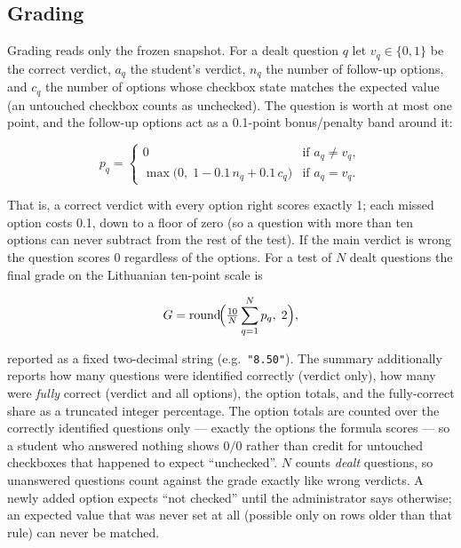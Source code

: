 \documentclass[11pt,a4paper]{article}
\newcommand{\code}[1]{\texttt{#1}}
\begin{document}
\subsection{Grading}
\label{sec:grading}

Grading reads only the frozen snapshot. For a dealt question $q$ let
$v_q \in \{0,1\}$ be the correct verdict, $a_q$ the student's verdict,
$n_q$ the number of follow-up options, and $c_q$ the number of options
whose checkbox state matches the expected value (an untouched checkbox
counts as unchecked). The question is worth at most one point, and the
follow-up options act as a 0.1-point bonus/penalty band around it:

\begin{equation*}
p_q =
\begin{cases}
  0 & \text{if } a_q \neq v_q,\\[2pt]
  \max\bigl(0,\; 1 - 0.1\,n_q + 0.1\,c_q\bigr) & \text{if } a_q = v_q.
\end{cases}
\end{equation*}

That is, a correct verdict with every option right scores exactly 1;
each missed option costs 0.1, down to a floor of zero (so a question
with more than ten options can never subtract from the rest of the
test). If the main verdict is wrong the question scores 0 regardless
of the options. For a test of $N$ dealt
questions the final grade on the Lithuanian ten-point scale is

\begin{equation*}
G = \operatorname{round}\!\Bigl(\tfrac{10}{N}\sum_{q=1}^{N} p_q,\; 2\Bigr),
\end{equation*}

reported as a fixed two-decimal string (e.g.\ \code{"8.50"}). The
summary additionally reports how many questions were identified
correctly (verdict only), how many were \emph{fully} correct (verdict
and all options), the option totals, and the fully-correct share as a
truncated integer percentage. The option totals are counted over the
correctly identified questions only --- exactly the options the formula
scores --- so a student who answered nothing shows $0/0$ rather than
credit for untouched checkboxes that happened to expect ``unchecked''.
$N$ counts \emph{dealt} questions, so unanswered questions count
against the grade exactly like wrong verdicts. A newly added option
expects ``not checked'' until the administrator says otherwise; an
expected value that was never set at all (possible only on rows older
than that rule) can never be matched.
\end{document}
